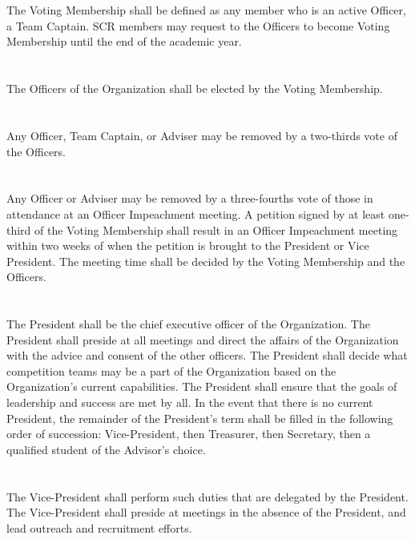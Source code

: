 \documentclass[12pt]{cls/constitution}
\begin{document}
\section{}
The Voting Membership shall be defined as any member who is an active Officer, a Team Captain. SCR members may request to the Officers to become Voting Membership until the end of the academic year.

\section{}
The Officers of the Organization shall be elected by the Voting Membership.

\section{}
Any Officer, Team Captain, or Adviser may be removed by a two-thirds vote of the Officers.

\section{}
Any Officer or Adviser may be removed by a three-fourths vote of those in attendance at an Officer Impeachment meeting. A petition signed by at least one-third of the Voting Membership shall result in an Officer Impeachment meeting within two weeks of when the petition is brought to the President or Vice President. The meeting time shall be decided by the Voting Membership and the Officers.

\section{}
The President shall be the chief executive officer of the Organization. The President shall preside at all meetings and direct the affairs of the Organization with the advice and consent of the other officers. The President shall decide what competition teams may be a part of the Organization based on the Organization’s current capabilities. The President shall ensure that the goals of leadership and success are met by all. In the event that there is no current President, the remainder of the President’s term shall be filled in the following order of succession:  Vice-President, then Treasurer, then Secretary, then a qualified student of the Advisor’s choice.

\section{}
The Vice-President shall perform such duties that are delegated by the President. The Vice-President shall preside at meetings in the absence of the President, and lead outreach and recruitment efforts. 
\end{document}
